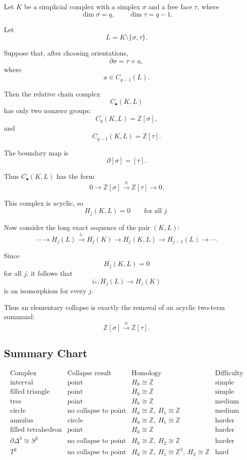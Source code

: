\documentclass[12pt,a4paper]{article}
\theoremstyle{notespace}
\begin{document}
Let \(K\) be a simplicial complex with a simplex \(\sigma\) and a free face \(\tau\), where
\[
\dim \sigma=q,
\qquad
\dim \tau=q-1.
\]

Let
\[
L=K\setminus\{\sigma,\tau\}.
\]

Suppose that, after choosing orientations,
\[
\partial\sigma=\tau+a,
\]
where
\[
a\in C_{q-1}(L).
\]

Then the relative chain complex
\[
C_\bullet(K,L)
\]
has only two nonzero groups:
\[
C_q(K,L)=\mathbb Z[\sigma],
\]
and
\[
C_{q-1}(K,L)=\mathbb Z[\tau].
\]

The boundary map is
\[
\partial[\sigma]=[\tau].
\]

Thus \(C_\bullet(K,L)\) has the form
\[
0\longrightarrow \mathbb Z[\sigma]
\xrightarrow{\cong}
\mathbb Z[\tau]
\longrightarrow 0.
\]

This complex is acyclic, so
\[
H_j(K,L)=0
\qquad
\text{for all }j.
\]

Now consider the long exact sequence of the pair \((K,L)\):
\[
\cdots
\longrightarrow H_j(L)
\xrightarrow{i_*}
H_j(K)
\longrightarrow H_j(K,L)
\longrightarrow H_{j-1}(L)
\longrightarrow \cdots .
\]

Since
\[
H_j(K,L)=0
\]
for all \(j\), it follows that
\[
i_*\colon H_j(L)\to H_j(K)
\]
is an isomorphism for every \(j\).

Thus an elementary collapse is exactly the removal of an acyclic two-term summand:
\[
\mathbb Z[\sigma]\xrightarrow{\cong}\mathbb Z[\tau].
\]

\subsection{Summary Chart}

\[
\begin{array}{c|c|c|c}
	\text{Complex} & \text{Collapse result} & \text{Homology} & \text{Difficulty} \\
	\hline
	\text{interval}
	&
	\text{point}
	&
	H_0\cong \mathbb Z
	&
	\text{simple}
	\\
	\hline
	\text{filled triangle}
	&
	\text{point}
	&
	H_0\cong \mathbb Z
	&
	\text{simple}
	\\
	\hline
	\text{tree}
	&
	\text{point}
	&
	H_0\cong \mathbb Z
	&
	\text{medium}
	\\
	\hline
	\text{circle}
	&
	\text{no collapse to point}
	&
	H_0\cong \mathbb Z,\ H_1\cong \mathbb Z
	&
	\text{medium}
	\\
	\hline
	\text{annulus}
	&
	\text{circle}
	&
	H_0\cong \mathbb Z,\ H_1\cong \mathbb Z
	&
	\text{harder}
	\\
	\hline
	\text{filled tetrahedron}
	&
	\text{point}
	&
	H_0\cong \mathbb Z
	&
	\text{harder}
	\\
	\hline
	\partial\Delta^3\cong S^2
	&
	\text{no collapse to point}
	&
	H_0\cong \mathbb Z,\ H_2\cong \mathbb Z
	&
	\text{harder}
	\\
	\hline
	T^2
	&
	\text{no collapse to point}
	&
	H_0\cong \mathbb Z,\ H_1\cong \mathbb Z^2,\ H_2\cong \mathbb Z
	&
	\text{hard}
\end{array}
\]
\end{document}
